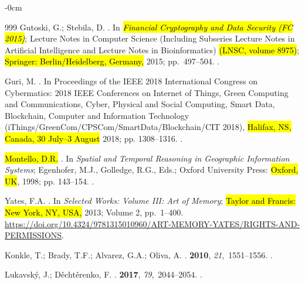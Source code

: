 \documentclass[mathematics,article,accept,pdftex,moreauthors]{Definitions/mdpi}
\begin{document}
\begin{adjustwidth}{-\extralength}{0cm}
\begin{thebibliography}{999}
Gutoski, G.; Stebila, D.
.
\newblock In \emph{\hl{Financial Cryptography and Data Security
(FC 2015)}}; { Lecture Notes in Computer Science (Including Subseries Lecture
  Notes in Artificial Intelligence and Lecture Notes in Bioinformatics)} \hl{(LNSC, volume 8975)};  \hl{Springer:  Berlin/Heidelberg, Germany,} 2015; pp.~497--504.
.

Guri, M.
.
\newblock In Proceedings of the IEEE 2018 International Congress
  on Cybermatics: 2018 IEEE Conferences on Internet of Things, Green Computing
  and Communications, Cyber, Physical and Social Computing, Smart Data,
  Blockchain, Computer and Information Technology 
  (iThings/GreenCom/CPSCom/SmartData/Blockchain/CIT 2018), \hl{Halifax, NS, Canada, 30 July--3 August} 2018; pp. 1308--1316.
.

\hl{Montello, D.R.}
. In {\em Spatial and Temporal
  Reasoning in Geographic Information Systems}; Egenhofer, M.J., Golledge,
  R.G., Eds.; Oxford University Press: \hl{Oxford, UK},  1998; pp. 143--154.
.

Yates, F.A.
.
\newblock In {\em Selected Works: Volume III: Art of Memory}; \hl{Taylor and Francis: New York, NY, USA,} 2013; Volume 2, pp.~1--400.
\newblock
  {\url{https://doi.org/10.4324/9781315010960/ART-MEMORY-YATES/RIGHTS-AND-PERMISSIONS}}.

Konkle, T.; Brady, T.F.; Alvarez, G.A.; Oliva, A.
.
 {\bf 2010}, {\em 21},~1551--1556.
.

Lukavsk{\'{y}}, J.; D{\v{e}}cht{\v{e}}renko, F.
.
 {\bf 2017}, {\em
  79},~2044--2054.
.




\end{thebibliography}
\end{adjustwidth}
\end{document}
